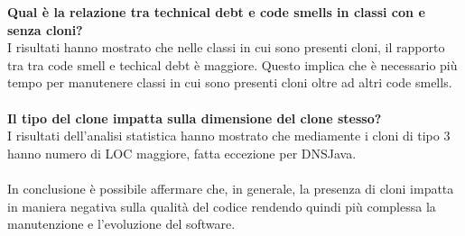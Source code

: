 \textbf{Qual è la relazione tra technical debt e code smells in classi con e senza cloni?}\\
I risultati hanno mostrato che nelle classi in cui sono presenti cloni, il rapporto tra tra code smell e techical debt è maggiore. Questo implica che è necessario più tempo per manutenere classi in cui sono presenti cloni oltre ad altri code smells.\\ \\
\textbf{Il tipo del clone impatta sulla dimensione del clone stesso?}\\
I risultati dell'analisi statistica hanno mostrato che mediamente i cloni di tipo 3 hanno numero di LOC maggiore, fatta eccezione per DNSJava. \\ \\
In conclusione è possibile affermare che, in generale, la presenza di cloni impatta in maniera negativa sulla qualità del codice rendendo quindi più complessa la manutenzione e l'evoluzione del software.